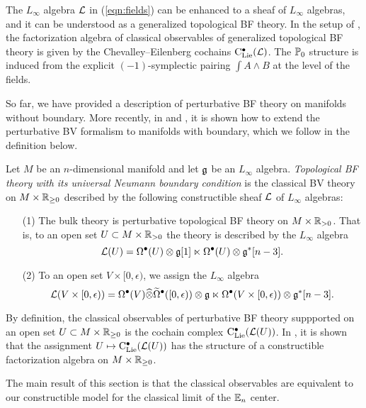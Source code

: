 \documentclass[11pt]{amsart}
\numberwithin{equation}{section}
\begin{document}
\begin{rmk}
The $L_\infty$ algebra $\mathcal L$ in (\ref{eqn:fields}) can be enhanced to a sheaf of $L_\infty$ algebras,
and it can be understood as a generalized topological BF theory. 
In the setup of \cite{CG2}, the factorization algebra of classical observables of generalized topological BF theory is given by the Chevalley--Eilenberg cochains ${\rm C}_{\rm Lie}^\bullet (\mathcal L)$.   
The $\mathbb P_0$ structure is induced from the explicit $(-1)$-symplectic pairing $\int A \wedge B$ at the level of the fields. 
\end{rmk}

So far, we have provided a description of perturbative BF theory on manifolds without boundary. 
More recently, in \cite{ButsonYoo} and \cite{Eugene}, 
it is shown how to extend the perturbative BV formalism to manifolds with boundary, 
which we follow in the definition below. 

\begin{dfn}
Let $M$ be an $n$-dimensional manifold and let $\mathfrak g$ be an $L_\infty$ algebra. 
{\em Topological BF theory with its universal Neumann boundary condition} is the classical BV theory on $M \times \mathbb R_{\geq 0}$ described by the following constructible sheaf $\mathcal L$ of $L_\infty$ algebras:
\begin{itemize}
\item[(1)] 
The bulk theory is perturbative topological BF theory on $M \times \mathbb R_{>0}$. 
That is, to an open set $U \subset M \times \mathbb R_{>0}$ the theory is described by the $L_\infty$ algebra 
\[
\mathcal L (U) = \Omega^{\bullet} (U) \otimes \mathfrak g [1] \ltimes \Omega^{\bullet} (U) \otimes \mathfrak g^* [n-3] .
\]
\item[(2)] 
To an open set $V \times [0,\epsilon)$, we assign the $L_\infty$ algebra
\[
\mathcal L (V \times [0,\epsilon)) = \Omega^\bullet (V) \widehat{\otimes} \widetilde{\Omega}^\bullet([0,\epsilon)) \otimes \mathfrak g \ltimes \Omega^{\bullet} (V \times [0,\epsilon)) \otimes \mathfrak g^* [n-3] .
\]
\end{itemize}
\end{dfn}

By definition, the classical observables of perturbative BF theory suppported on an open set $U \subset M \times \mathbb R_{\geq 0}$ is the cochain complex ${\rm C}_{\rm Lie}^\bullet (\mathcal L (U))$. 
In \cite{Eugene}, it is shown that the assignment $U \mapsto {\rm C}_{\rm Lie}^\bullet (\mathcal L(U))$ has the structure of a constructible factorization algebra on $M \times \mathbb R_{\geq 0}$. 

The main result of this section is that the classical observables are equivalent to our constructible model for the classical limit of the $\mathbb E_n$ center. 
\end{document}
